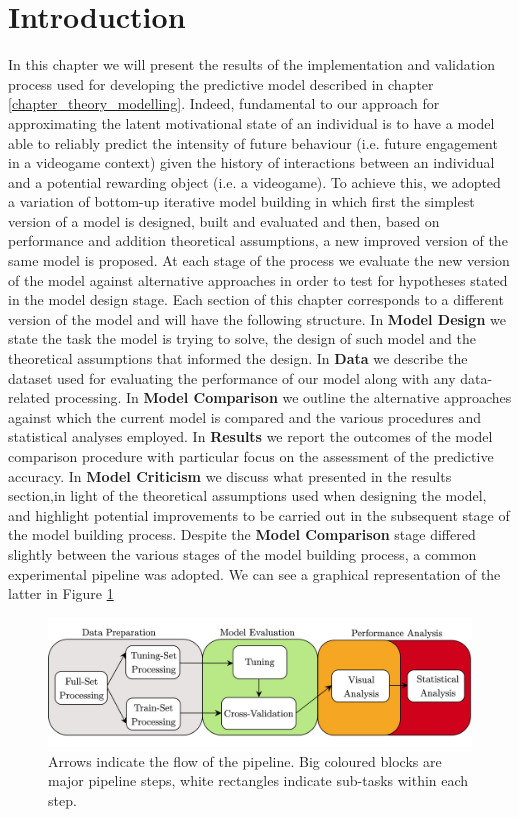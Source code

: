 \section{Introduction}
\label{implementation_testing_introduction}

In this chapter we will present the results of the implementation and validation process used for developing the predictive model described in chapter \ref{chapter_theory_modelling}. Indeed, fundamental to our approach for approximating the latent motivational state of an individual is to have a model able to reliably predict the intensity of future behaviour (i.e. future engagement in a videogame context) given the history of interactions between an individual and a potential rewarding object (i.e. a videogame). To achieve this, we adopted a variation of bottom-up iterative model building \cite{gelman2020bayesian} in which first the simplest version of a model is designed, built and evaluated and then, based on performance and addition theoretical assumptions, a new improved version of the same model is proposed. At each stage of the process we evaluate the new version of the model against alternative approaches in order to test for hypotheses stated in the model design stage. Each section of this chapter corresponds to a different version of the model and will have the following structure. In \textbf{Model Design} we state the task the model is trying to solve, the design of such model and the theoretical assumptions that informed the design. In \textbf{Data} we describe the dataset used for evaluating the performance of our model along with any data-related processing. In \textbf{Model Comparison} we outline the alternative approaches against which the current model is compared and the various procedures and statistical analyses employed. In \textbf{Results} we report the outcomes of the model comparison procedure with particular focus on the assessment of the predictive accuracy. In \textbf{Model Criticism} we discuss what presented in the results section,in light of the theoretical assumptions used when designing the model, and highlight potential improvements to be carried out in the subsequent stage of the model building process. Despite the \textbf{Model Comparison} stage differed slightly between the various stages of the model building process, a common experimental pipeline was adopted. We can see a graphical representation of the latter in Figure \ref{fig: pipeline_eval}
\begin{figure}[h]
  \centering
  \includegraphics[width=\textwidth]{images/chapter_3/pipeline_eval.png}
    \caption[\textbf{Model implementation experimental pipeline}]{Arrows indicate the flow of the pipeline. Big coloured blocks are major pipeline steps, white rectangles indicate sub-tasks within each step.}
    \label{fig: pipeline_eval}
\end{figure}
